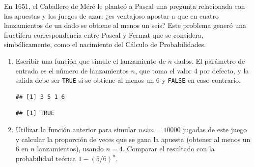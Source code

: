\documentclass[
]{book}
\newenvironment{Shaded}{\begin{snugshade}}{\end{snugshade}}
\newcommand{\ControlFlowTok}[1]{\textcolor[rgb]{0.13,0.29,0.53}{\textbf{#1}}}
\newcommand{\DataTypeTok}[1]{\textcolor[rgb]{0.13,0.29,0.53}{#1}}
\newcommand{\DecValTok}[1]{\textcolor[rgb]{0.00,0.00,0.81}{#1}}
\newcommand{\KeywordTok}[1]{\textcolor[rgb]{0.13,0.29,0.53}{\textbf{#1}}}
\newcommand{\NormalTok}[1]{#1}
\newcommand{\OperatorTok}[1]{\textcolor[rgb]{0.81,0.36,0.00}{\textbf{#1}}}
\newcommand{\OtherTok}[1]{\textcolor[rgb]{0.56,0.35,0.01}{#1}}
\newcommand{\StringTok}[1]{\textcolor[rgb]{0.31,0.60,0.02}{#1}}
\theoremstyle{break}
\theoremstyle{definition}
\theoremstyle{definition}
\theoremstyle{definition}
\theoremstyle{remark}
\begin{document}
En 1651, el Caballero de Méré le planteó a Pascal una pregunta
relacionada con las apuestas y los juegos de azar: ¿es ventajoso
apostar a que en cuatro lanzamientos de un dado se obtiene al menos
un seis? Este problema generó una fructífera correspondencia entre
Pascal y Fermat que se considera, simbólicamente, como el nacimiento
del Cálculo de Probabilidades.

\begin{enumerate}
\def\labelenumi{\alph{enumi})}
\item
  Escribir una función que simule el lanzamiento de \(n\) dados. El
  parámetro de entrada es el número de lanzamientos \(n\), que toma
  el valor 4 por defecto, y la salida debe ser \texttt{TRUE} si se
  obtiene al menos un 6 y \texttt{FALSE} en caso contrario.

\begin{Shaded}
\end{Shaded}

\begin{verbatim}
## [1] 3 5 1 6
\end{verbatim}

\begin{Shaded}
\end{Shaded}

\begin{verbatim}
## [1] TRUE
\end{verbatim}
\item
  Utilizar la función anterior para simular \(nsim=10000\) jugadas
  de este juego y calcular la proporción de veces que se gana la
  apuesta (obtener al menos un 6 en \(n\) lanzamientos), usando
  \(n=4\). Comparar el resultado con la probabilidad teórica
  \(1-(5/6)^{n}\).


\end{enumerate}
\end{document}
